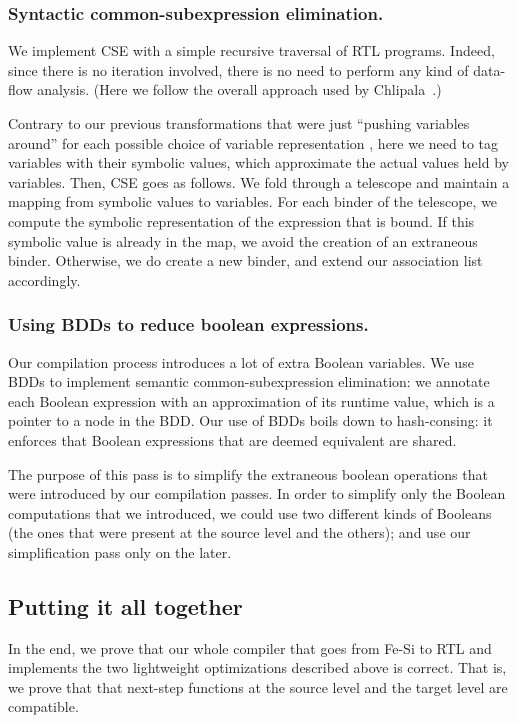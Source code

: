 \documentclass{llncs}
\begin{document}
\subsubsection{Syntactic common-subexpression elimination.}
We implement CSE with a simple recursive traversal of RTL
programs. Indeed, since there is no iteration involved, there is no
need to perform any kind of data-flow analysis. (Here we follow the
overall approach used by Chlipala~\cite{DBLP:conf/popl/Chlipala10}.)

Contrary to our previous transformations that were just ``pushing
variables around'' for each possible choice of variable representation
, here we need to tag variables with their symbolic values,
which approximate the actual values held by variables.
% 
%
Then, CSE goes as follows. We fold through a telescope and maintain a
mapping from symbolic values to variables. For each binder of the
telescope, we compute the symbolic representation of the expression
that is bound. 
%
If this symbolic value is already in the map, we avoid the creation of
an extraneous binder. Otherwise, we do create a new binder, and extend
our association list accordingly. 
 

\subsubsection{Using BDDs to reduce boolean expressions.}
Our compilation process introduces a lot of extra Boolean
variables. We use BDDs to implement semantic common-subexpression
elimination: we annotate each Boolean expression with an approximation
of its runtime value, which is a pointer to a node in the BDD. 
%
Our use of BDDs boils down to hash-consing: it enforces that Boolean
expressions that are deemed equivalent are shared.

The purpose of this pass is to simplify the extraneous boolean
operations that were introduced by our compilation passes. In order to
simplify only the Boolean computations that we introduced, we could
use two different kinds of Booleans (the ones that were present at the
source level and the others); and use our simplification pass only on
the later.

\subsection{Putting it all together}
In the end, we prove that our whole compiler that goes from Fe-Si to
RTL and implements the two lightweight optimizations described above
is correct. That is, we prove that that next-step functions at the
source level and the target level are compatible.
\end{document}
